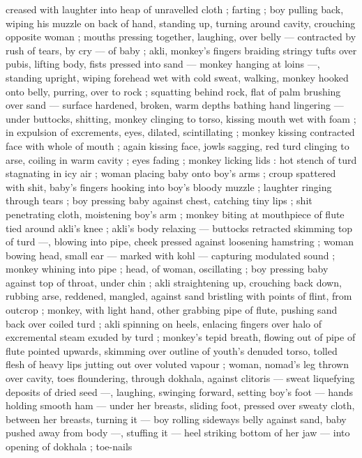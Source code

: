 creased with laughter into heap of unravelled cloth ; farting ; boy
pulling back, wiping his muzzle on back of hand, standing up, turning
around cavity, crouching opposite woman ; mouths pressing together,
laughing, over belly --- contracted by rush of tears, by cry --- of
baby ; akli, monkey's fingers braiding stringy tufts over pubis, lifting
body, fists pressed into sand --- monkey hanging at loins ---,
standing upright, wiping forehead wet with cold sweat, walking,
monkey hooked onto belly, purring, over to rock ; squatting behind
rock, flat of palm brushing over sand --- surface hardened, broken,
warm depths bathing hand lingering --- under buttocks, shitting,
monkey clinging to torso, kissing mouth wet with foam ; in expulsion
of excrements, eyes, dilated, scintillating ; monkey kissing
contracted face with whole of mouth ; again kissing face, jowls
sagging, red turd clinging to arse, coiling in warm cavity ; eyes fading
; monkey licking lids : hot stench of turd stagnating in icy air ; woman
placing baby onto boy's arms ; croup spattered with shit, baby's
fingers hooking into boy's bloody muzzle ; laughter ringing through
tears ; boy pressing baby against chest, catching tiny lips ; shit
penetrating cloth, moistening boy’s arm ; monkey biting at
mouthpiece of flute tied around akli’s knee ; akli's body relaxing ---
buttocks retracted skimming top of turd ---, blowing into pipe, cheek
pressed against loosening hamstring ; woman bowing head, small ear
--- marked with kohl --- capturing modulated sound ; monkey
whining into pipe ; head, of woman, oscillating ; boy pressing baby
against top of throat, under chin ; akli straightening up, crouching
back down, rubbing arse, reddened, mangled, against sand bristling
with points of flint, from outcrop ; monkey, with light hand, other
grabbing pipe of flute, pushing sand back over coiled turd ; akli
spinning on heels, enlacing fingers over halo of excremental steam
exuded by turd ; monkey's tepid breath, flowing out of pipe of flute
pointed upwards, skimming over outline of youth's denuded torso,
tolled flesh of heavy lips jutting out over voluted vapour ; woman,
nomad’s leg thrown over cavity, toes floundering, through dokhala,
against clitoris --- sweat liquefying deposits of dried seed ---,
laughing, swinging forward, setting boy's foot --- hands holding
smooth ham --- under her breasts, sliding foot, pressed over sweaty
cloth, between her breasts, turning it --- boy rolling sideways belly
against sand, baby pushed away from body ---, stuffing it --- heel
striking bottom of her jaw --- into opening of dokhala ; toe-nails
